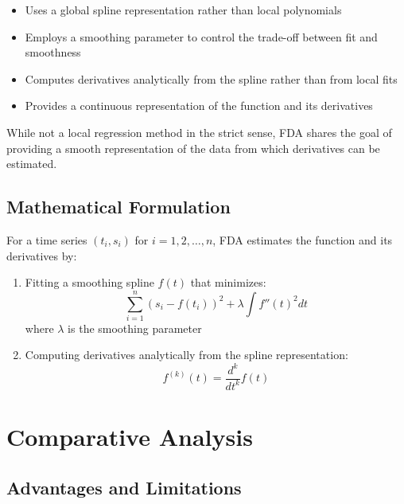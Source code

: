 \documentclass{article}
\begin{document}
\begin{itemize}
    \item Uses a global spline representation rather than local polynomials
    \item Employs a smoothing parameter to control the trade-off between fit and smoothness
    \item Computes derivatives analytically from the spline rather than from local fits
    \item Provides a continuous representation of the function and its derivatives
\end{itemize}

While not a local regression method in the strict sense, FDA shares the goal of providing a smooth representation of the data from which derivatives can be estimated.

\subsection{Mathematical Formulation}

For a time series $(t_i, s_i)$ for $i = 1, 2, \ldots, n$, FDA estimates the function and its derivatives by:

\begin{enumerate}
    \item Fitting a smoothing spline $f(t)$ that minimizes:
    \begin{equation}
        \sum_{i=1}^{n} (s_i - f(t_i))^2 + \lambda \int f''(t)^2 dt
    \end{equation}
    where $\lambda$ is the smoothing parameter
    
    \item Computing derivatives analytically from the spline representation:
    \begin{equation}
        f^{(k)}(t) = \frac{d^k}{dt^k} f(t)
    \end{equation}
\end{enumerate}

\section{Comparative Analysis}

\subsection{Advantages and Limitations}
\end{document}
